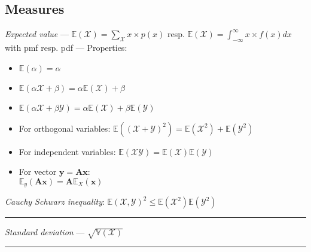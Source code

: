 \subsection*{Measures}
\emph{Expected value} --- 
$\mathbb{E}(\mathcal{X}) = \sum_{\mathcal{X}}x \times p(x)$ resp. $\mathbb{E}(\mathcal{X}) = \int_{-\infty}^{\infty}x \times f(x)dx$ with pmf resp. pdf --- Properties:
\begin{multicols}{2}
\begin{itemize}
    \item $\mathbb{E}(\alpha)=\alpha$
    \item $\mathbb{E}(\alpha\mathcal{X}+\beta)=\alpha\mathbb{E}(\mathcal{X})+\beta$
    \item $\mathbb{E}(\alpha\mathcal{X} + \beta\mathcal{Y})=\alpha\mathbb{E}(\mathcal{X})+\beta\mathbb{E}(\mathcal{Y})$
    \item For orthogonal variables:
    $\mathbb{E}((\mathcal{X}+\mathcal{Y})^2)=\mathbb{E}(\mathcal{X}^2) + \mathbb{E}(\mathcal{Y}^2)$
    \item For independent variables: $\mathbb{E}(\mathcal{X}\mathcal{Y})=\mathbb{E}(\mathcal{X})\mathbb{E}(\mathcal{Y})$
    \item For vector $\boldsymbol{y} = \boldsymbol{A}\boldsymbol{x}$:\\$\mathbb{E}_y(\boldsymbol{A}\boldsymbol{x})=\boldsymbol{A}\mathbb{E}_X(\boldsymbol{x})$
\end{itemize}
\end{multicols}
\emph{Cauchy Schwarz inequality}: $\mathbb{E}(\mathcal{X},\mathcal{Y})^2 \leq \mathbb{E}(\mathcal{X}^2)\mathbb{E}(\mathcal{Y}^2)$

{\color{lightgray}\hrule height 0.001mm}

\emph{Standard deviation} --- $\sqrt{\mathbb{V}(\mathcal{X})}$

{\color{lightgray}\hrule height 0.001mm}

